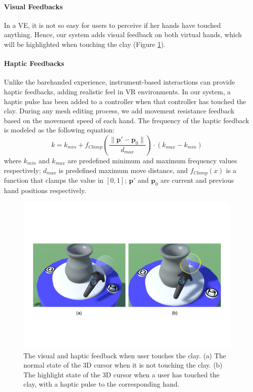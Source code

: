\documentclass{svjour3}                     %
\begin{document}
\paragraph{Visual Feedbacks}
In a VE, it is not so easy for users to perceive if her hands have touched anything. Hence, our system adds visual feedback on both virtual hands, which will be highlighted when touching the clay (Figure \ref{fig:highlight}).

\paragraph{Haptic Feedbacks}
Unlike the barehanded experience, instrument-based interactions can provide haptic feedbacks, adding realistic feel in VR environments. In our system, a haptic pulse has been added to a controller when that controller has touched the clay. During any mesh editing process, we add movement resistance feedback based on the movement speed of each hand. The frequency of the haptic feedback is modeled as the following equation:
\begin{equation}
k = k_{min} + f_{Clamp}(\frac{ \| \mathbf{p'} - \mathbf{p}_{0} \|}{d_{max}}) \cdot (k_{max} - k_{min})
\end{equation}
where $k_{min}$ and $k_{max}$ are predefined minimum and maximum frequency values respectively; $d_{max}$ is predefined maximum move distance, and $f_{Clamp}(x)$ is a function that clamps the value in $[0,1]$; $\mathbf{p'}$ and $\mathbf{p}_{0}$ are current and previous hand positions respectively.

\begin{figure}
\includegraphics[width=\textwidth]{fig10}
\caption{The visual and haptic feedback when user touches the clay. (a) The normal state of the 3D cursor when it is not touching the clay. (b) The highlight state of the 3D cursor when a user has touched the clay, with a haptic pulse to the corresponding hand.}
\label{fig:highlight}
\end{figure}
\end{document}
